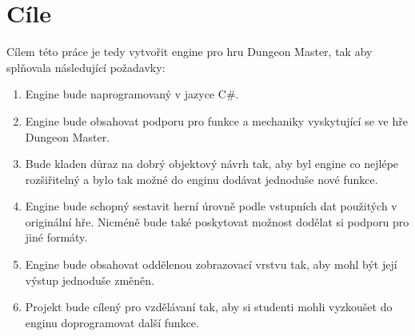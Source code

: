 \section{Cíle}

Cílem této práce je tedy vytvořit engine pro hru Dungeon Master, tak aby splňovala následující požadavky:
\begin{enumerate}[label=\textbf{C\arabic*}]
\item Engine bude naprogramovaný v jazyce C\#.
\item\label{aim-mechanics} Engine bude obsahovat podporu pro funkce a mechaniky vyskytující se ve hře Dungeon Master.
\item\label{aim-extensibility} Bude kladen důraz na dobrý objektový návrh tak, aby byl engine co nejlépe rozšiřitelný a bylo 
	tak možné do enginu dodávat jednoduše nové funkce.
\item\label{aim-builders} Engine bude schopný sestavit herní úrovně podle vstupních dat použitých v originální hře. Nicméně
	bude také poskytovat možnost dodělat si podporu pro jiné formáty.
\item\label{aim-rendering} Engine bude obsahovat oddělenou zobrazovací vrstvu tak, aby mohl být její výstup jednoduše změněn.
\item Projekt bude cílený pro vzdělávaní tak, aby si studenti mohli vyzkoušet do enginu doprogramovat další funkce.
\end{enumerate}
